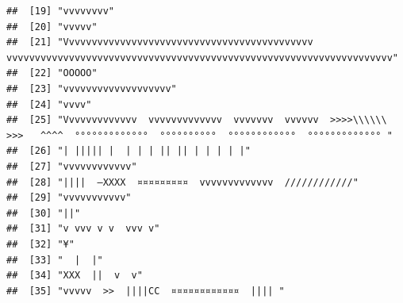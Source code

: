 \documentclass[
]{article}
\begin{document}
\begin{verbatim}
##  [19] "vvvvvvvv"                                                                                                                                 
##  [20] "vvvvv"                                                                                                                                    
##  [21] "Vvvvvvvvvvvvvvvvvvvvvvvvvvvvvvvvvvvvvvvvvvvv  vvvvvvvvvvvvvvvvvvvvvvvvvvvvvvvvvvvvvvvvvvvvvvvvvvvvvvvvvvvvvvvvvvvv"                       
##  [22] "OOOOO"                                                                                                                                    
##  [23] "vvvvvvvvvvvvvvvvvvv"                                                                                                                      
##  [24] "vvvv"                                                                                                                                     
##  [25] "Vvvvvvvvvvvvv  vvvvvvvvvvvvv  vvvvvvv  vvvvvv  >>>>\\\\\\   >>>   ^^^^  °°°°°°°°°°°°°  °°°°°°°°°°  °°°°°°°°°°°°  °°°°°°°°°°°°° "          
##  [26] "| ||||| |  | | | || || | | | | |"                                                                                                         
##  [27] "vvvvvvvvvvvv"                                                                                                                             
##  [28] "||||  –XXXX  ¤¤¤¤¤¤¤¤¤  vvvvvvvvvvvvv  ////////////"                                                                                      
##  [29] "vvvvvvvvvvv"                                                                                                                              
##  [30] "||"                                                                                                                                       
##  [31] "v vvv v v  vvv v"                                                                                                                         
##  [32] "¥"                                                                                                                                        
##  [33] "  |  |"                                                                                                                                   
##  [34] "XXX  ||  v  v"                                                                                                                            
##  [35] "vvvvv  >>  ||||CC  ¤¤¤¤¤¤¤¤¤¤¤¤  |||| "                                                                                                   

\end{verbatim}
\end{document}
